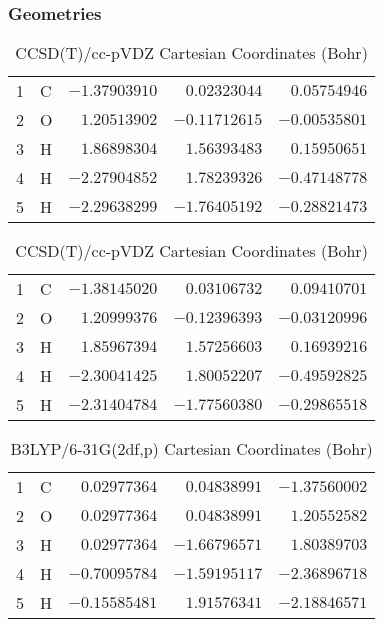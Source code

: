 \documentclass[10pt,oneside]{article}
\begin{document}
\begin{table}[h!]
\subsubsection*{Geometries}
\begin{multicols}{2}
\centering
\caption{CCSD(T)/cc-pVTZ Cartesian Coordinates (Bohr)}
\begin{tabular}{llrrr}
\toprule
1  & C  & $-1.37903910$ & $ 0.02323044$ & $ 0.05754946$ \\
2  & O  & $ 1.20513902$ & $-0.11712615$ & $-0.00535801$ \\
3  & H  & $ 1.86898304$ & $ 1.56393483$ & $ 0.15950651$ \\
4  & H  & $-2.27904852$ & $ 1.78239326$ & $-0.47148778$ \\
5  & H  & $-2.29638299$ & $-1.76405192$ & $-0.28821473$ \\
\bottomrule
\end{tabular}
\caption{CCSD(T)/cc-pVDZ Cartesian Coordinates (Bohr)}
\begin{tabular}{llrrr}
\toprule
1  & C  & $-1.38145020$ & $ 0.03106732$ & $ 0.09410701$ \\
2  & O  & $ 1.20999376$ & $-0.12396393$ & $-0.03120996$ \\
3  & H  & $ 1.85967394$ & $ 1.57256603$ & $ 0.16939216$ \\
4  & H  & $-2.30041425$ & $ 1.80052207$ & $-0.49592825$ \\
5  & H  & $-2.31404784$ & $-1.77560380$ & $-0.29865518$ \\
\bottomrule
\end{tabular}
\end{multicols}
\end{table}

\begin{table}[h]
\centering
\caption{B3LYP/6-31G(2df,p) Cartesian Coordinates (Bohr)}
\begin{tabular}{llrrr}
\toprule
1  & C  & $ 0.02977364$ & $ 0.04838991$ & $-1.37560002$ \\
2  & O  & $ 0.02977364$ & $ 0.04838991$ & $ 1.20552582$ \\
3  & H  & $ 0.02977364$ & $-1.66796571$ & $ 1.80389703$ \\
4  & H  & $-0.70095784$ & $-1.59195117$ & $-2.36896718$ \\
5  & H  & $-0.15585481$ & $ 1.91576341$ & $-2.18846571$ \\
\bottomrule
\end{tabular}
\end{table}
\end{document}
